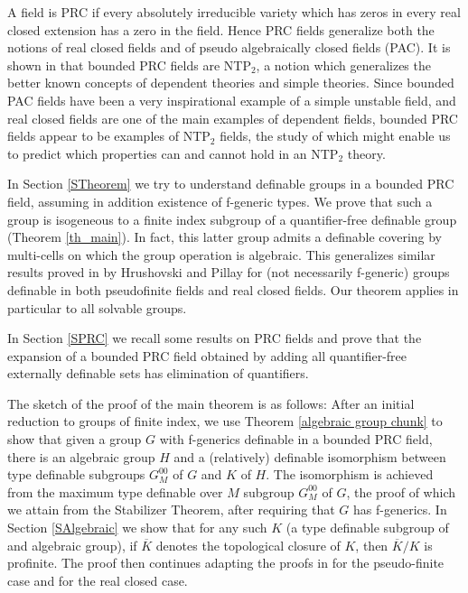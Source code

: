 \documentclass[12pt]{article}
\theoremstyle{definition}
\theoremstyle{mystyle}
\theoremstyle{remark}
\begin{document}
A field is PRC if every absolutely irreducible variety which has
zeros in every real closed extension has a zero in the field.
Hence PRC fields generalize both the notions of real closed fields
and of pseudo algebraically closed fields (PAC). It is shown in
\cite{Mon} that bounded PRC fields are NTP$_2$, a notion which
generalizes the better known concepts of dependent theories and
simple theories.   Since bounded PAC fields have been a very
inspirational example of a simple unstable field,  and real closed
fields are one of the main examples of dependent fields, bounded
PRC fields appear to be examples of NTP$_2$ fields, the study of
which might enable us to predict which properties can and cannot
hold in an NTP$_2$ theory.

In Section \ref{STheorem} we try to understand definable groups in a bounded
PRC field, assuming in addition existence of f-generic types. We prove
that such a group is isogeneous to a finite index subgroup of a
quantifier-free definable group (Theorem \ref{th_main}). In fact,
this latter group admits a definable covering by multi-cells on
which the group operation is algebraic. This generalizes similar
results proved in \cite{HrPi} by Hrushovski and Pillay for (not
necessarily f-generic) groups definable in both pseudofinite
fields and real closed fields. Our theorem applies in particular
to all solvable groups.

In Section \ref{SPRC} we recall some results on PRC fields and
prove that the expansion of a bounded PRC field obtained by adding
all quantifier-free externally definable sets has elimination of
quantifiers.

The sketch of the proof of the main theorem is as follows: After
an initial reduction to groups of finite index, we use Theorem
\ref{algebraic group chunk} to show that given a group $G$ with
f-generics definable in a bounded PRC field, there is an algebraic
group $H$ and a (relatively) definable isomorphism between type
definable subgroups $G^{00}_M$ of $G$ and $K$ of $H$. The
isomorphism is achieved from the maximum type definable over $M$
subgroup $G^{00}_M$ of $G$, the proof of which we attain from the Stabilizer Theorem, after requiring that $G$ has f-generics.
In Section \ref{SAlgebraic} we show that for any such $K$ (a type
definable subgroup of and algebraic group), if $\overline{K}$
denotes the topological closure of  $K$, then $\overline{K}/K$ is
profinite. The proof then continues adapting the proofs in
\cite{HrPi} for the pseudo-finite case and for the real closed case.
\end{document}
